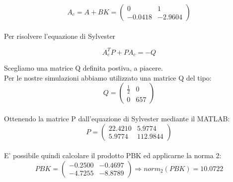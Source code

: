 \documentclass[a4paper,13pt]{article}
\begin{document}
\begin{equation*}
	A_{c}=A+BK=
\begin{pmatrix}

	0&1\\-0.0418&-2.9604

\end{pmatrix}
\end{equation*} \\
	
	Per risolvere l'equazione di Sylvester
	
\begin{equation*}
	A_{c}^{T}P + PA_{c} = -Q              %
\end{equation*}

	Scegliamo una matrice Q definita postiva, a piacere.\\
	Per le nostre simulazioni abbiamo utilizzato una matrice Q del tipo:\\

\begin{equation*}
	Q=
\begin{pmatrix}

	\frac{1}{2}&0\\0&657

\end{pmatrix}
\end{equation*}\\
	
	Ottenendo la matrice P dall'equazione di Sylvester mediante il MATLAB:\\
	
\begin{equation*}
	P=
\begin{pmatrix}

	22.4210&5.9774\\5.9774&112.9844

\end{pmatrix}
\end{equation*}\\

	E' possibile quindi calcolare il prodotto PBK ed applicarne la norma 2:\\
	
\begin{equation*}
	PBK=
\begin{pmatrix}

	-0.2500&-0.4697\\-4.7255&-8.8789

\end{pmatrix}
	\Rightarrow norm_{2}(PBK)=10.0722
\end{equation*}\\
\end{document}
